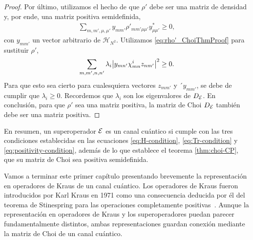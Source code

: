 \begin{proof}
Por último, utilizamos el hecho de que $\rho'$ debe ser una matriz 
de densidad y, por ende, una matriz positiva semidefinida,
\begin{align}
\sum_{m,m',\mu,\mu'}
y_{mm'}\rho'_{mm'\mu\mu'}y^*_{\mu\mu'}
\geq0,
\end{align}
con $y_{mm'}$ un vector arbitrario de $\mathcal{H}_{N^2}$.
Utilizamos \eqref{eq:rho'_ChoiThmProof} para sustituir $\rho'$,
\begin{align}
\sum_{m,m',n,n'}\lambda_i\abs{y_{mn'}\chi^i_{mn}z_{nm'}}^2\geq0.
\end{align}
Para que esto sea cierto para cualesquiera vectores $z_{mm'}$ y  
´$y_{mm'}$, se debe de cumplir que $\lambda_i\geq0$. Recordemos
que $\lambda_i$ son los eigenvalores de $D_{\mathcal{E}}$.
En conclusión, para que $\rho'$ sea una matriz positiva, la matriz de Choi 
$D_{\mathcal{E}}$ también debe ser una matriz positiva. 
\end{proof}
En resumen, un superoperador $\mathcal{E}$ es un canal cuántico si 
cumple con las tres condiciones establecidas en las ecuaciones 
\eqref{eq:H-condition}, \eqref{eq:Tr-condition}
y \eqref{eq:positivity-condition}, además de lo que establece 
el teorema \ref{thm:choi-CP}, que su matriz de Choi sea 
positiva semidefinida. 

Vamos a terminar este primer capítulo presentando 
brevemente la representación en operadores de Kraus 
de un canal cuántico. Los operadores de Kraus fueron 
introducidos por Karl Kraus en 1971 como una consecuencia
deducida por él del teorema de Stinespring para las operaciones 
completamente positivas~\cite{bengtsson_zyczkowski_2017}. 
Aunque la representación en operadores de Kraus y los
superoperadores puedan parecer fundamentalmente distintos, 
ambas representaciones guardan conexión mediante 
la matriz de Choi de un canal cuántico.

